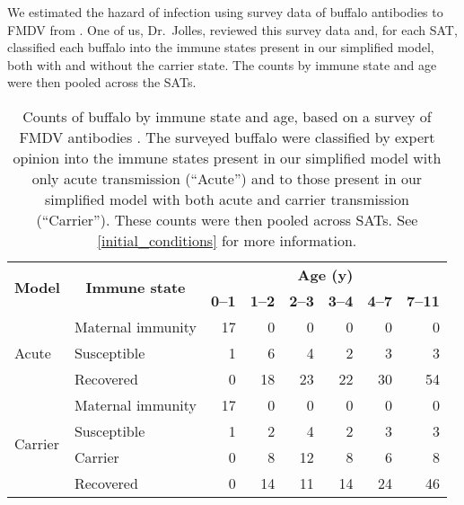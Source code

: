 \documentclass[12pt, USenglish]{article}  %
\begin{document}
We estimated the hazard of infection using survey data of buffalo
antibodies to FMDV from
\citeauthor{hedger_1972}
\autocite[\autoref{tab:hedger_data}]{hedger_1972}.
One of us, Dr.~Jolles, reviewed this survey data and, for each SAT,
classified each buffalo into the immune states present in our
simplified model, both with and without the carrier state. The counts
by immune state and age were then pooled across the SATs.

\begin{table}
  \centering
  \begin{tabular}{|l|l|rrrrrr|}
    \hline
    \multicolumn{1}{|c}{\multirow{2}{*}{\textbf{Model}}}
    & \multicolumn{1}{|c}{\multirow{2}{*}{\textbf{Immune state}}}
    & \multicolumn{6}{|c|}{\textbf{Age (y)}} \\
    & & \multicolumn{1}{|c}{\textbf{0--1}}
    & \multicolumn{1}{c}{\textbf{1--2}}
    & \multicolumn{1}{c}{\textbf{2--3}}
    & \multicolumn{1}{c}{\textbf{3--4}}
    & \multicolumn{1}{c}{\textbf{4--7}}
    & \multicolumn{1}{c|}{\textbf{7--11}} \\
    \hline
    \multirow{3}{*}{Acute}
    & Maternal immunity & 17 & 0 & 0 & 0 & 0 & 0 \\
    & Susceptible & 1 & 6 & 4 & 2 & 3 & 3 \\
    & Recovered & 0 & 18 & 23 & 22 & 30 & 54 \\
    \hline
    \multirow{4}{*}{Carrier}
    & Maternal immunity & 17 & 0 & 0 & 0 & 0 & 0 \\
    & Susceptible & 1 & 2 & 4 & 2 & 3 & 3 \\
    & Carrier & 0 & 8 & 12 & 8 & 6 & 8 \\
    & Recovered & 0 & 14 & 11 & 14 & 24 & 46 \\
    \hline
  \end{tabular}
  \caption{Counts of buffalo by immune state and age, based on a
    survey of FMDV antibodies \autocite{hedger_1972}.  The surveyed
    buffalo were classified by expert opinion into the immune states
    present in our simplified model with only acute transmission
    (\enquote{Acute}) and to those present in our simplified model
    with both acute and carrier transmission
    (\enquote{Carrier}). These counts were then pooled across
    SATs. See \autoref{initial_conditions} for more information.}
  \label{tab:hedger_data}
\end{table}
\end{document}
